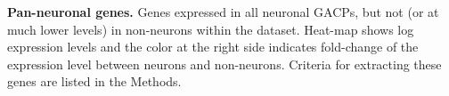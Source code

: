 \textbf{Pan-neuronal genes.} 
Genes expressed in all neuronal GACPs, but not (or at much lower levels) in non-neurons within the dataset. Heat-map shows log expression levels and the color at the right side indicates fold-change of the expression level between neurons and non-neurons. Criteria for extracting these genes are listed in the Methods.



